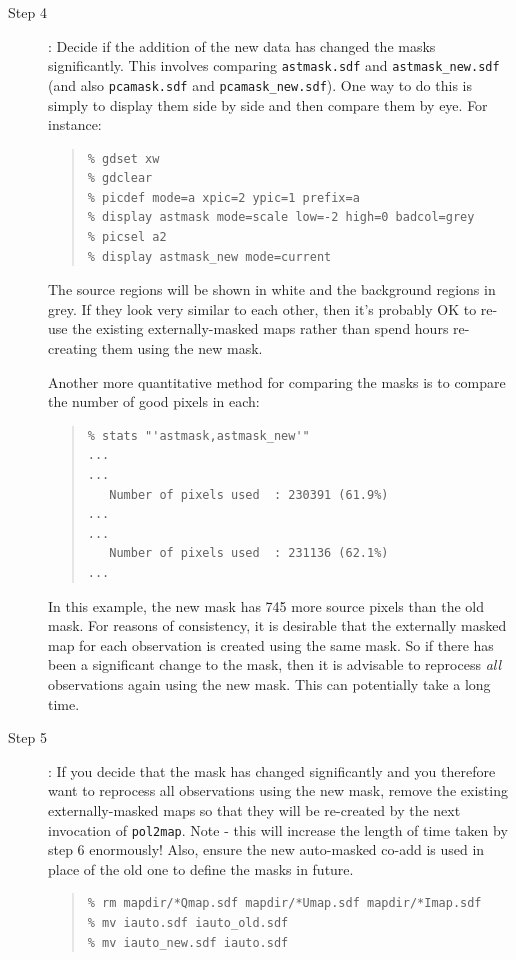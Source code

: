\documentclass[twoside,11pt]{starlink}
\begin{document}
\begin{description}
\item[Step 4]: Decide if the addition of the new data has changed the masks
significantly. This involves comparing \texttt{astmask.sdf} and
\texttt{astmask\_new.sdf} (and also \texttt{pcamask.sdf} and
\texttt{pcamask\_new.sdf}). One way to do this is simply to display them
side by side and then compare them by eye. For instance:
\begin{quote}
\begin{verbatim}
% gdset xw
% gdclear
% picdef mode=a xpic=2 ypic=1 prefix=a
% display astmask mode=scale low=-2 high=0 badcol=grey
% picsel a2
% display astmask_new mode=current
\end{verbatim}
\end{quote}

The source regions will be shown in white and the background regions in
grey. If they look very similar to each other, then it's probably OK to
re-use the existing externally-masked maps rather than spend hours
re-creating them using the new mask.

Another more quantitative method for comparing the masks is to compare the
number of good pixels in each:
\begin{quote}
\begin{verbatim}
% stats "'astmask,astmask_new'"
...
...
   Number of pixels used  : 230391 (61.9%)
...
...
   Number of pixels used  : 231136 (62.1%)
...
\end{verbatim}
\end{quote}

In this example, the new mask has 745 more source pixels than the old
mask. For reasons of consistency, it is desirable that the externally
masked map for each observation is created using the same mask. So if
there has been a significant change to the mask, then it is advisable
to reprocess \emph{all} observations again using the new mask.
This can potentially take a long time.

\item[Step 5]: If you decide that the mask has changed significantly and
you therefore want to reprocess all observations using the new mask,
remove the existing externally-masked maps so that they will be
re-created by the next invocation of \texttt{pol2map}. Note - this will
increase the length of time taken by step 6 enormously! Also, ensure the new
auto-masked co-add is used in place of the old one to define the masks
in future.
\begin{quote}
\begin{verbatim}
% rm mapdir/*Qmap.sdf mapdir/*Umap.sdf mapdir/*Imap.sdf
% mv iauto.sdf iauto_old.sdf
% mv iauto_new.sdf iauto.sdf
\end{verbatim}
\end{quote}


\end{description}
\end{document}
